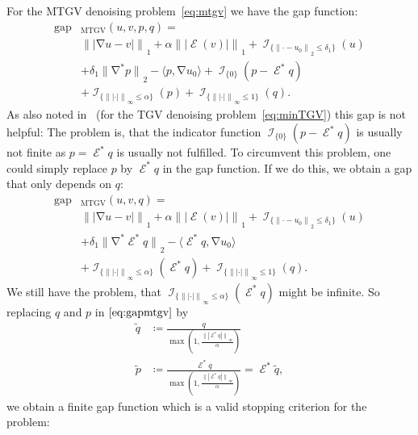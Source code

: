 \documentclass[twocolumn,envcountsame]{svjour3}
\newcommand{\norm}[2][]{{\|{#2}\|_{}}_{#1}}
\newcommand{\abs}[1]{|#1|}
\DeclareMathOperator{\ind}{\mathcal{I}}
\DeclareMathOperator{\gap}{gap}
\DeclareMathOperator{\grad}{\nabla}
\DeclareMathOperator{\symgrad}{\mathcal{E}}
\begin{document}
For the MTGV denoising problem~\eqref{eq:mtgv}
we have the gap function:
\begin{equation}
  \label{eq:gapmtgv}
  \begin{split}
    \gap&_{\operatorname{MTGV}}(u,v,p,q)=\\
    &\norm[1]{\abs{\grad u - v}} + 
    \alpha\norm[1]{\abs{\symgrad(v)}}
    +\ind_{\{\norm[2]{\cdot-u_0}\leq \delta_1\}}(u)\\
    &+\delta_1\norm[2]{\grad^* p} - \langle p, \grad u_0\rangle 
    +\ind_{\{0\}}(p - \symgrad^*q) \\
    &+\ind_{\{\norm[\infty]{\abs{\cdot}}\leq\alpha\}}(p) +
    \ind_{\{\norm[\infty]{\abs{\cdot}}\leq 1\}}(q).
  \end{split}
\end{equation}
As also noted in~\cite{bredies2015preconditioned} (for the TGV denoising problem~\eqref{eq:minTGV}) this gap is not helpful:
The problem is, that the indicator function $\ind_{\{0\}}(p - \symgrad^*q)$ is usually not finite as $p=\symgrad^{*}q$ is usually not fulfilled.
To circumvent this problem, one could simply replace $p$ by $\symgrad^*q$ in the gap function. 
If we do this, we obtain a gap that only depends on $q$:
\begin{equation}
  \label{eq:gapmtgvmod}
  \begin{split}   
    \gap&_{\operatorname{MTGV}}(u,v,q)=\\
    &\norm[1]{\abs{\grad u - v}} + 
    \alpha\norm[1]{\abs{\symgrad(v)}}
    +\ind_{\{\norm[2]{\cdot-u_0}\leq \delta_1\}}(u)\\
    &+\delta_1\norm[2]{\grad^* \symgrad^*q} - \langle \symgrad^*q, \grad u_0\rangle \\
    &+\ind_{\{\norm[\infty]{\abs{\cdot}}\leq\alpha\}}(\symgrad^*q) +
    \ind_{\{\norm[\infty]{\abs{\cdot}}\leq 1\}}(q).
  \end{split}
\end{equation}
We still have the problem, that 
$\ind_{\{\norm[\infty]{\abs{\cdot}}\leq\alpha\}}(\symgrad^*q)$ might be infinite.
So replacing $q$ and $p$ in $\eqref{eq:gapmtgv}$ by
\begin{align*}
  \tilde q&\coloneqq\frac{q}{\max\left(1,\frac{\norm[\infty]{\abs{\symgrad^*q}}}{\alpha}\right)}\\
  \tilde
  p&\coloneqq\frac{\symgrad^*q}{\max\left(1,\frac{\norm[\infty]{\abs{\symgrad^*q}}}{\alpha}\right)}=\symgrad^*\tilde
     q,
\end{align*}
we obtain a finite gap function
which is a valid stopping criterion for the problem:
\end{document}
